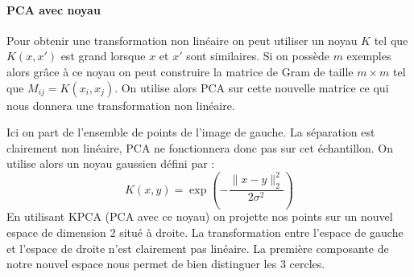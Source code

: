 \paragraph{PCA avec noyau}
Pour obtenir une transformation non linéaire on peut utiliser un noyau $K$ tel que $K(x, x')$ est grand lorsque $x$ et $x'$ sont similaires. Si on possède $m$ exemples alors grâce à ce noyau on peut construire la matrice de Gram de taille $m \times m$ tel que $M_{ij} = K(x_i, x_j)$. On utilise alors PCA sur cette nouvelle matrice ce qui nous donnera une transformation non linéaire.
\begin{center}
	\begin{tikzpicture}[scale=0.3]
		
	\end{tikzpicture}
	\begin{tikzpicture}[scale=1.4]
		
	\end{tikzpicture}
\end{center}
Ici on part de l'ensemble de points de l'image de gauche. La séparation est clairement non linéaire, PCA ne fonctionnera donc pas sur cet échantillon. On utilise alors un noyau gaussien défini par :
$$ K(x, y) = \exp \left( - \dfrac{\| x - y \|_2^2}{2 \sigma^2} \right) $$
En utilisant KPCA (PCA avec ce noyau) on projette nos points sur un nouvel espace de dimension 2 situé à droite. La transformation entre l'espace de gauche et l'espace de droite n'est clairement pas linéaire. La première composante de notre nouvel espace nous permet de bien distinguer les 3 cercles.

